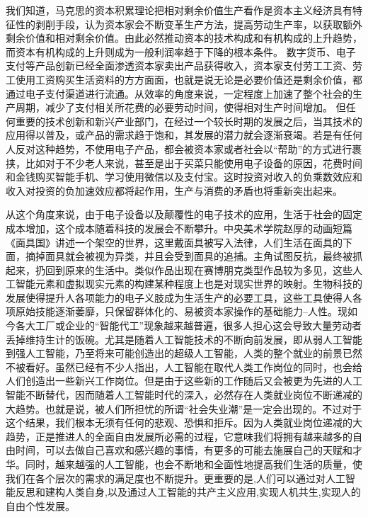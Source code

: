 \documentclass{ctexart}
\begin{document}
我们知道，马克思的资本积累理论把相对剩余价值生产看作是资本主义经济具有特征性的剥削手段，认为资本家会不断变革生产方法，提高劳动生产率，以获取额外剩余价值和相对剩余价值\cite{高峰2004产品创新与资本积累}。由此必然推动资本的技术构成和有机构成的上升趋势，而资本有机构成的上升则成为一般利润率趋于下降的根本条件。
数字货币、电子支付等产品创新已经全面渗透资本家卖出产品获得收入，资本家支付劳工工资、劳工使用工资购买生活资料的方方面面，也就是说无论是必要价值还是剩余价值，都通过电子支付渠道进行流通。从效率的角度来说，一定程度上加速了整个社会的生产周期，减少了支付相关所花费的必要劳动时间，使得相对生产时间增加。
但任何重要的技术创新和新兴产业部门，在经过一个较长时期的发展之后，当其技术的应用得以普及，或产品的需求趋于饱和，其发展的潜力就会逐渐衰竭。若是有任何人反对这种趋势，不使用电子产品，都会被资本家或者社会以“帮助”的方式进行裹挟，比如对于不少老人来说，甚至是出于买菜只能使用电子设备的原因，花费时间和金钱购买智能手机、学习使用微信以及支付宝。这时投资对收入的负乘数效应和收入对投资的负加速效应都将起作用，生产与消费的矛盾也将重新突出起来。

从这个角度来说，由于电子设备以及颠覆性的电子技术的应用，生活于社会的固定成本增加，这个成本随着科技的发展会不断攀升。中央美术学院赵厚的动画短篇《面具国》讲述一个架空的世界，这里戴面具被写入法律，人们生活在面具的下面，摘掉面具就会被视为异类，并且会受到面具的追捕。主角试图反抗，最终被抓起来，扔回到原来的生活中。类似作品出现在赛博朋克类型作品较为多见，这些人工智能元素和虚拟现实元素的构建某种程度上也是对现实世界的映射\cite{栗桢2013关于赛博朋克电影主要元素的哲学思考}。生物科技的发展使得提升人各项能力的电子义肢成为生活生产的必要工具，这些工具使得人各项原始技能逐渐萎靡，只保留群体化的、易被资本家操作的基础能力--人性。现如今各大工厂或企业的“智能代工”现象越来越普遍，很多人担心这会导致大量劳动者丢掉维持生计的饭碗\cite{张爱丹2019人工智能时代就业问题的伦理思考}。尤其是随着人工智能技术的不断向前发展，即从弱人工智能到强人工智能，乃至将来可能创造出的超级人工智能，人类的整个就业的前景已然不被看好。虽然已经有不少人指出，人工智能在取代人类工作岗位的同时，也会给人们创造出一些新兴工作岗位。但是由于这些新的工作随后又会被更为先进的人工智能不断替代，因而随着人工智能时代的深入，必然存在人类就业岗位不断递减的大趋势。也就是说，被人们所担忧的所谓“社会失业潮”是一定会出现的。不过对于这个结果，我们根本无须有任何的悲观、恐惧和拒斥。因为人类就业岗位递减的大趋势，正是推进人的全面自由发展所必需的过程，它意味我们将拥有越来越多的自由时间，可以去做自己喜欢和感兴趣的事情，有更多的可能去施展自己的天赋和才华。同时，越来越强的人工智能，也会不断地和全面性地提高我们生活的质量，使我们在各个层次的需求的满足度也不断提升。更重要的是,人们可以通过对人工智能反思和建构人类自身,以及通过人工智能的共产主义应用,实现人机共生,实现人的自由个性发展\cite{庄忠正2019人工智能的人学反思}。
\end{document}
